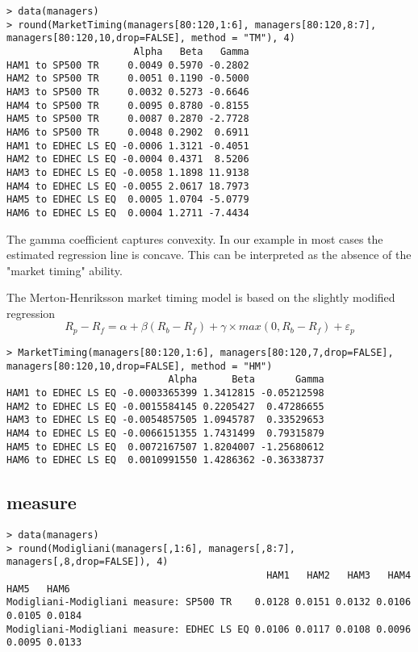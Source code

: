 \documentclass[11pt,a4paper]{article}
\begin{document}
\begingroup
\fontsize{9pt}{12pt}\selectfont
\begin{verbatim}
> data(managers)
> round(MarketTiming(managers[80:120,1:6], managers[80:120,8:7],
managers[80:120,10,drop=FALSE], method = "TM"), 4)
                      Alpha   Beta   Gamma
HAM1 to SP500 TR     0.0049 0.5970 -0.2802
HAM2 to SP500 TR     0.0051 0.1190 -0.5000
HAM3 to SP500 TR     0.0032 0.5273 -0.6646
HAM4 to SP500 TR     0.0095 0.8780 -0.8155
HAM5 to SP500 TR     0.0087 0.2870 -2.7728
HAM6 to SP500 TR     0.0048 0.2902  0.6911
HAM1 to EDHEC LS EQ -0.0006 1.3121 -0.4051
HAM2 to EDHEC LS EQ -0.0004 0.4371  8.5206
HAM3 to EDHEC LS EQ -0.0058 1.1898 11.9138
HAM4 to EDHEC LS EQ -0.0055 2.0617 18.7973
HAM5 to EDHEC LS EQ  0.0005 1.0704 -5.0779
HAM6 to EDHEC LS EQ  0.0004 1.2711 -7.4434
\end{verbatim}
\endgroup
The gamma coefficient captures convexity. In our example in most cases the estimated regression line is concave. This can be interpreted as the absence of the "market timing" ability.

The Merton-Henriksson market timing model is based on the slightly modified regression
\[
  R_{p}-R_{f}=\alpha+\beta (R_{b}-R_{f})+\gamma\times max(0,R_{b}-R_{f})+\varepsilon_{p}
\]

\begingroup
\fontsize{9pt}{12pt}\selectfont
\begin{verbatim}
> MarketTiming(managers[80:120,1:6], managers[80:120,7,drop=FALSE],
managers[80:120,10,drop=FALSE], method = "HM")
                            Alpha      Beta       Gamma
HAM1 to EDHEC LS EQ -0.0003365399 1.3412815 -0.05212598
HAM2 to EDHEC LS EQ -0.0015584145 0.2205427  0.47286655
HAM3 to EDHEC LS EQ -0.0054857505 1.0945787  0.33529653
HAM4 to EDHEC LS EQ -0.0066151355 1.7431499  0.79315879
HAM5 to EDHEC LS EQ  0.0072167507 1.8204007 -1.25680612
HAM6 to EDHEC LS EQ  0.0010991550 1.4286362 -0.36338737
\end{verbatim}
\endgroup

\subsection{\cite{modigliani1997risk} measure}
\begingroup
\fontsize{9pt}{12pt}\selectfont
\begin{verbatim}
> data(managers)
> round(Modigliani(managers[,1:6], managers[,8:7], managers[,8,drop=FALSE]), 4)
                                             HAM1   HAM2   HAM3   HAM4   HAM5   HAM6
Modigliani-Modigliani measure: SP500 TR    0.0128 0.0151 0.0132 0.0106 0.0105 0.0184
Modigliani-Modigliani measure: EDHEC LS EQ 0.0106 0.0117 0.0108 0.0096 0.0095 0.0133
\end{verbatim}
\endgroup



\end{document}
